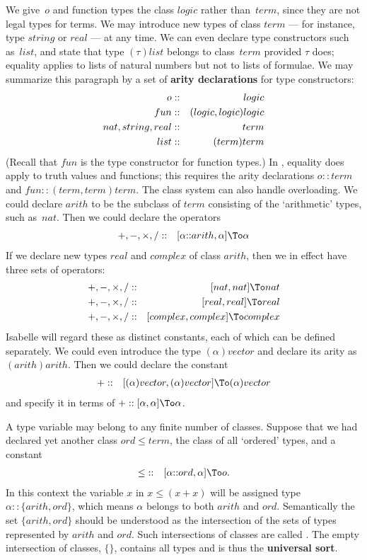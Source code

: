 We give~$o$ and function types the class $logic$ rather than~$term$, since
they are not legal types for terms.  We may introduce new types of class
$term$ --- for instance, type $string$ or $real$ --- at any time.  We can
even declare type constructors such as~$list$, and state that type
$(\tau)list$ belongs to class~$term$ provided $\tau$ does; equality
applies to lists of natural numbers but not to lists of formulae.  We may
summarize this paragraph by a set of {\bf arity declarations} for type
constructors:
\begin{eqnarray*}\index{*o type}\index{*fun type}
  o             & :: & logic \\
  fun           & :: & (logic,logic)logic \\
  nat, string, real     & :: & term \\
  list          & :: & (term)term
\end{eqnarray*}
(Recall that $fun$ is the type constructor for function types.)
In , equality does apply to truth values and
functions;  this requires the arity declarations ${o::term}$
and ${fun::(term,term)term}$.  The class system can also handle
overloading. We could declare $arith$ to be the
subclass of $term$ consisting of the `arithmetic' types, such as~$nat$.
Then we could declare the operators
\begin{eqnarray*}
  {+},{-},{\times},{/}  & :: & [\alpha{::}arith,\alpha]\To \alpha
\end{eqnarray*}
If we declare new types $real$ and $complex$ of class $arith$, then we
in effect have three sets of operators:
\begin{eqnarray*}
  {+},{-},{\times},{/}  & :: & [nat,nat]\To nat \\
  {+},{-},{\times},{/}  & :: & [real,real]\To real \\
  {+},{-},{\times},{/}  & :: & [complex,complex]\To complex 
\end{eqnarray*}
Isabelle will regard these as distinct constants, each of which can be defined
separately.  We could even introduce the type $(\alpha)vector$ and declare
its arity as $(arith)arith$.  Then we could declare the constant
\begin{eqnarray*}
  {+}  & :: & [(\alpha)vector,(\alpha)vector]\To (\alpha)vector 
\end{eqnarray*}
and specify it in terms of ${+} :: [\alpha,\alpha]\To \alpha$.

A type variable may belong to any finite number of classes.  Suppose that
we had declared yet another class $ord \le term$, the class of all
`ordered' types, and a constant
\begin{eqnarray*}
  {\le}  & :: & [\alpha{::}ord,\alpha]\To o.
\end{eqnarray*}
In this context the variable $x$ in $x \le (x+x)$ will be assigned type
$\alpha{::}\{arith,ord\}$, which means $\alpha$ belongs to both $arith$ and
$ord$.  Semantically the set $\{arith,ord\}$ should be understood as the
intersection of the sets of types represented by $arith$ and $ord$.  Such
intersections of classes are called .  The empty
intersection of classes, $\{\}$, contains all types and is thus the {\bf
  universal sort}.

